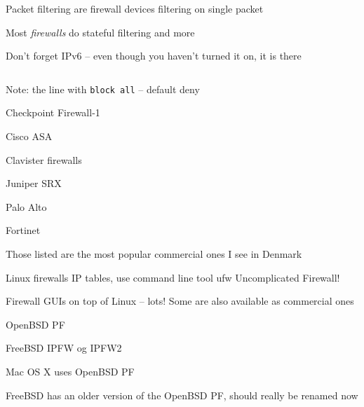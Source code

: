 \documentclass[Screen16to9,17pt]{foils}
\begin{document}
\begin{list1}
\item Packet filtering are firewall devices filtering on single packet
\item Most \emph{firewalls} do stateful filtering and more
\item Don't forget IPv6 -- even though you haven't turned it on, it is there
\end{list1}



\begin{figure}[H]\tiny
\inputminted{shell}{policies/gateway-config-simple.conf}
\end{figure}

Note: the line with \verb+block all+ -- default deny

\begin{list2}
\item Checkpoint Firewall-1 
\item Cisco ASA 
\item Clavister firewalls 
\item Juniper SRX 
\item Palo Alto 
\item Fortinet 
\end{list2}

Those listed are the most popular commercial ones I see in Denmark


\begin{list2}
\item Linux firewalls IP tables, use command line tool ufw Uncomplicated Firewall!
\item Firewall GUIs on top of Linux -- lots! Some are also available as commercial ones
\item OpenBSD PF
\item FreeBSD IPFW og IPFW2 
\item Mac OS X uses OpenBSD PF
\item FreeBSD has an older version of the OpenBSD PF, should really be renamed now
\end{list2}
\end{document}
